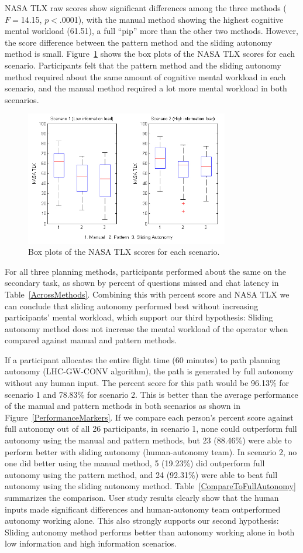 \documentclass[journal]{IEEEtran}
\begin{document}
NASA TLX raw scores show significant differences among the three methods ($F=$14.15, $p<$.0001), with the manual method showing the highest cognitive mental workload (61.51), a full ``pip'' more than the other two methods. However, the score difference between the pattern method and the sliding autonomy method is small. Figure~\ref{NASATLX} shows the box plots of the NASA TLX scores for each scenario. Participants felt that the pattern method and the sliding autonomy method required about the same amount of cognitive mental workload in each scenario, and the manual method required a lot more mental workload in both scenarios.

\begin{figure}
\centering
\includegraphics[width=3.5in]{NASATLXBoxPlot.JPG}
\caption{Box plots of the NASA TLX scores for each scenario.}
\label{NASATLX}
\end{figure}

For all three planning methods, participants performed about the same on the secondary task, as shown by percent of questions missed and chat latency in Table~\ref{AcrossMethods}. Combining this with percent score and NASA TLX we can conclude that sliding autonomy performed best without increasing participants' mental workload, which support our third hypothesis: Sliding autonomy method does not increase the mental workload of the operator when compared against manual and pattern methods.

If a participant allocates the entire flight time (60 minutes) to path planning autonomy (LHC-GW-CONV algorithm), the path is generated by full autonomy without any human input. The percent score for this path would be 96.13\% for scenario 1 and 78.83\% for scenario 2. This is better than the average performance of the manual and pattern methods in both scenarios as shown in Figure~\ref{PerformanceMarkers}. If we compare each person's percent score against full autonomy out of all 26 participants, in scenario 1, none could outperform full autonomy using the manual and pattern methods, but 23 (88.46\%) were able to perform better with sliding autonomy (human-autonomy team). In scenario 2, no one did better using the manual method, 5 (19.23\%) did outperform full autonomy using the pattern method, and 24 (92.31\%) were able to beat full autonomy using the sliding autonomy method. Table~\ref{CompareToFullAutonomy} summarizes the comparison. User study results clearly show that the human inputs made significant differences and human-autonomy team outperformed autonomy working alone. This also strongly supports our second hypothesis: Sliding autonomy method performs better than autonomy working alone in both low information and high information scenarios.
\end{document}
